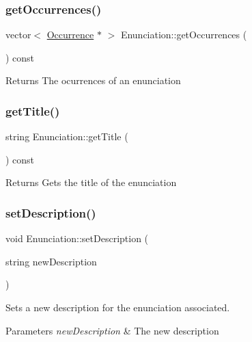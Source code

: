 \subsubsection{\texorpdfstring{get\+Occurrences()}{getOccurrences()}}
{\footnotesize\ttfamily vector$<$ \hyperlink{class_occurrence}{Occurrence} $\ast$ $>$ Enunciation\+::get\+Occurrences (\begin{DoxyParamCaption}{ }\end{DoxyParamCaption}) const}

\begin{DoxyReturn}{Returns}
The ocurrences of an enunciation 
\end{DoxyReturn}
\mbox{\label{class_enunciation_a7db0b7bc585b133d7faae9a7a8f78be6}} 
\subsubsection{\texorpdfstring{get\+Title()}{getTitle()}}
{\footnotesize\ttfamily string Enunciation\+::get\+Title (\begin{DoxyParamCaption}{ }\end{DoxyParamCaption}) const}

\begin{DoxyReturn}{Returns}
Gets the title of the enunciation 
\end{DoxyReturn}
\mbox{\label{class_enunciation_ae3a90d3e7ed1072d44c9801c689aa08f}} 
\subsubsection{\texorpdfstring{set\+Description()}{setDescription()}}
{\footnotesize\ttfamily void Enunciation\+::set\+Description (\begin{DoxyParamCaption}\item[{string}]{new\+Description }\end{DoxyParamCaption})}



Sets a new description for the enunciation associated. 


\begin{DoxyParams}{Parameters}
{\em new\+Description} & The new description \\
\hline
\end{DoxyParams}
\mbox{\label{class_enunciation_a84cebe1417311997307664608305b305}} 
